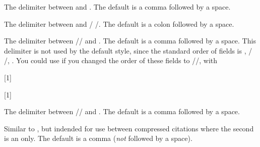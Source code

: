 \documentclass[DIV=9]{scrartcl}
\makeatletter
\def\textvisiblespace{%
  \raisebox{-2.2pt}{%
    \mbox{\kern.04em\vrule \@height.5ex \@width.12ex}%
    \vbox{\hrule \@width.2em \@height.12ex}%
    \hbox{\vrule \@height.5ex \@width.12ex}%
    \kern.04em}}
\newcommand*{\highlight}[2][1]{\textcolor{highlight#1}{#2}}
\makeatother
\begin{document}
\begin{ltxsyntax}
The delimiter between  and .
The default is a comma followed by a space.
\begin{bibexample}
\renewcommand*{\locdatedelim}{\highlight{\textbf{\addcomma}\textvisiblespace}}
\makeatletter\bbx@opt@mergedate@false\makeatother
{}
\end{bibexample}

The delimiter between  and \slash%
\slash{}.
The default is a colon followed by a space.
\begin{bibexample}
\makeatletter\bbx@opt@mergedate@false\makeatother
\renewcommand*{\locpubdelim}{\highlight{\textbf{\addcolon}\textvisiblespace}}
\end{bibexample}


The delimiter between \slash{}\slash
{} and .
The default is a comma followed by a space.
This delimiter is not used by the default style, since the standard order of
fields is , \slash
{}\slash{}, .
You could use  if you changed the order of these fields to
\slash{}\slash{},
  with
\begin{biblatexcode}
[1]{%
  \newunit}
\end{biblatexcode}
\begin{bibexample}
\renewcommand*{\publocdelim}{\highlight[1]{\textbf{\addcomma}\textvisiblespace}}
\renewcommand*{\locdatedelim}{\highlight[2]{%
  \textbf{\addcomma}\textvisiblespace}}
[1]{%
  \setunit*{\publocdelim}%
  \setunit*{\locdatedelim}%
  \newunit}
\makeatletter\bbx@opt@mergedate@false\makeatother
{}
\end{bibexample}


The delimiter between \slash{}\slash
{} and .
The default is a comma followed by a space.
\begin{bibexample}
\renewcommand*{\pubdatedelim}{\highlight{\textbf{\addcomma}\textvisiblespace}}
\makeatletter\bbx@opt@mergedate@false\makeatother
{}
\end{bibexample}

Similar to , but indended for use between compressed
citations where the second is an  only.
The default is a comma (\emph{not} followed by a space).
\end{ltxsyntax}
\end{document}

